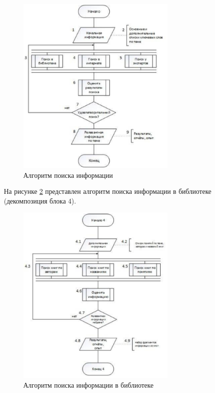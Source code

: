 	\begin{figure}[h!]
      \centering
      \includegraphics[width=0.7\textwidth]{images/searchinfo/1.png}
      \caption{Алгоритм поиска информации}
      \label{searchinfo:1}
    \end{figure}

    \pagebreak

	На рисунке \ref{searchinfo:2} представлен алгоритм поиска информации в библиотеке
(декомпозиция блока 4).

	\begin{figure}[h!]
		\centering
		\includegraphics[width=0.7\textwidth]{images/searchinfo/2.png}
		\caption{Алгоритм поиска информации в библиотеке}
		\label{searchinfo:2}
    \end{figure}

